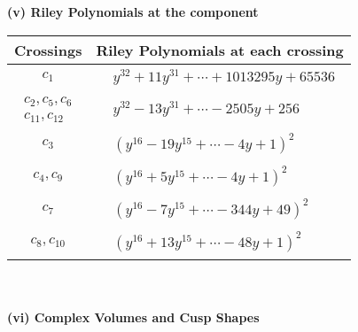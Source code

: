 \documentclass[1p]{elsarticle_modified}
\theoremstyle{definition}
\begin{document}
\newpage\renewcommand{\arraystretch}{1}
\flushleft \textbf{(v) Riley Polynomials at the component}\newline \\
\begin{tabular}{m{50pt}|m{274pt}}
Crossings & \hspace{64pt}Riley Polynomials at each crossing \\
\hline $$\begin{aligned}c_{1}\end{aligned}$$&$\begin{aligned}
&y^{32}+11 y^{31}+\cdots+1013295 y+65536
\end{aligned}$\\
\hline $$\begin{aligned}c_{2},c_{5},c_{6}\\c_{11},c_{12}\end{aligned}$$&$\begin{aligned}
&y^{32}-13 y^{31}+\cdots-2505 y+256
\end{aligned}$\\
\hline $$\begin{aligned}c_{3}\end{aligned}$$&$\begin{aligned}
&(y^{16}-19 y^{15}+\cdots-4 y+1)^{2}
\end{aligned}$\\
\hline $$\begin{aligned}c_{4},c_{9}\end{aligned}$$&$\begin{aligned}
&(y^{16}+5 y^{15}+\cdots-4 y+1)^{2}
\end{aligned}$\\
\hline $$\begin{aligned}c_{7}\end{aligned}$$&$\begin{aligned}
&(y^{16}-7 y^{15}+\cdots-344 y+49)^{2}
\end{aligned}$\\
\hline $$\begin{aligned}c_{8},c_{10}\end{aligned}$$&$\begin{aligned}
&(y^{16}+13 y^{15}+\cdots-48 y+1)^{2}
\end{aligned}$\\
\hline
\end{tabular}\\~\\
\newpage\flushleft \textbf{(vi) Complex Volumes and Cusp Shapes}
\end{document}
